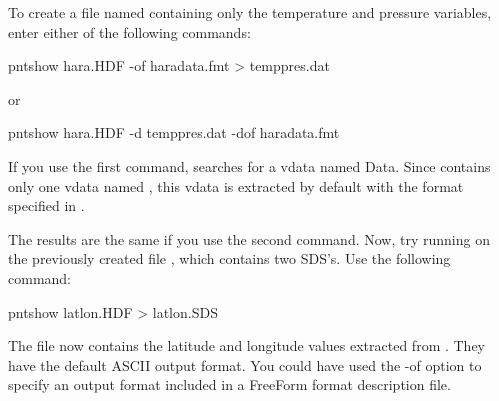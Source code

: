 To create a file named  containing only the
temperature and pressure variables, enter either of the following
commands:

\begin{example}
pntshow hara.HDF -of haradata.fmt > temppres.dat 
\end{example}

or 

\begin{example}
pntshow hara.HDF -d temppres.dat -dof haradata.fmt 
\end{example}

If you use the first command,  searches 
for a vdata named Data. Since  contains only one vdata
named , this vdata is extracted by default with the format
specified in .

The results are the same if you use the second command. Now, try
running  on the previously created file ,
which contains two SDS's. Use the following command:

\begin{example}
pntshow latlon.HDF > latlon.SDS 
\end{example}

The  file now contains the latitude and longitude
values extracted from . They have the default ASCII
output format. You could have used the -of option to specify an output
format included in a FreeForm format description file.

